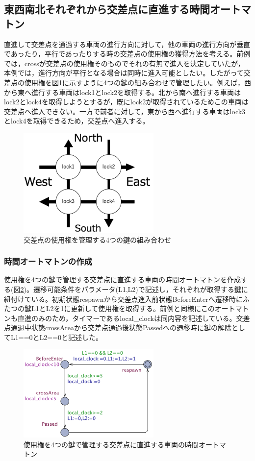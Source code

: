 \documentclass[twocolumn,10pt]{jsarticle}
\begin{document}
	\subsection{東西南北それぞれから交差点に直進する時間オートマトン}
	直進して交差点を通過する車両の進行方向に対して，他の車両の進行方向が垂直であったり，平行であったりする時の交差点の使用権の獲得方法を考える。前例では，crossが交差点の使用権そのものでそれの有無で進入を決定していたが，本例では，進行方向が平行となる場合は同時に進入可能としたい。したがって交差点の使用権を図\ref{oTWoL}に示すように4つの鍵の組み合わせで管理したい。例えば，西から東へ進行する車両はlock1とlock2を取得する。北から南へ進行する車両はlock2とlock4を取得しようとするが，既にlock2が取得されているためこの車両は交差点へ進入できない。一方で前者に対して，東から西へ進行する車両はlock3とlock4を取得できるため，交差点へ進入する。
	\begin{figure}[htbp]
	\centering
	\includegraphics[width=70mm]{onTheWayofLock.png}
	\caption{交差点の使用権を管理する4つの鍵の組み合わせ}
	\label{oTWoL}
	\end{figure}
	\subsubsection{時間オートマトンの作成}
	使用権を4つの鍵で管理する交差点に直進する車両の時間オートマトンを作成する(図\ref{news})。遷移可能条件をパラメータ(L1,L2)で記述し，それぞれが取得する鍵に紐付けている。初期状態respawnから交差点進入前状態BeforeEnterへ遷移時にふたつの鍵L1とL2を1に更新して使用権を取得する。前例と同様にこのオートマトンも直進のみのため，タイマーであるlocal\_clockは同内容を記述している。交差点通過中状態crossAreaから交差点通過後状態Passedへの遷移時に鍵の解除としてL1==0とL2==0と記述した。
	\begin{figure}[htbp]
	\centering
	\includegraphics[width=70mm]{news.png}
	\caption{使用権を4つの鍵で管理する交差点に直進する車両の時間オートマトン}
	\label{news}
	\end{figure}
\end{document}
